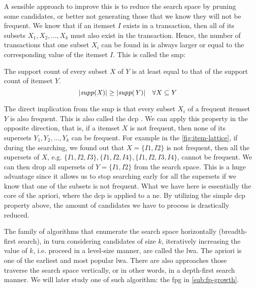A sensible approach to improve this is to reduce the search space by pruning some candidates, or better not generating those that we know they will not be frequent.
We know that if an itemset $I$ exists in a transaction, then all of its subsets $X_1, X_2, \dots, X_k$ must also exist in the transaction.
Hence, the number of transactions that one subset $X_i$ can be found in is always larger or equal to the corresponding value of the itemset $I$.
This is called the \acl{smp}:
\begin{definition}
    The support count of every subset $X$ of $Y$ is at least equal to that of the support count of itemset $Y$.
    \begin{equation}
        \lvert \mathit{supp({X})} \rvert \geq \lvert \mathit{supp({Y})} \rvert \quad \forall X \subseteq Y
    \end{equation}
\end{definition}

The direct implication from the \acl{smp} is that every subset $X_i$ of a frequent itemset $Y$ is also frequent.
This is also called the \acl{dcp} \citep{Aggarwal15}.
We can apply this property in the opposite direction, that is, if a itemset $X$ is not frequent, then none of its supersets $Y_1, Y_2, \dots, Y_k$ can be frequent.
For example in the \autoref{fig:item-lattice}, if during the searching, we found out that $X = \{I1, I2\}$ is not frequent, then all the supersets of $X$, e.g. $\{I1, I2, I3\}, \{I1, I2 , I4\}, \{I1, I2 , I3, I4\}$, cannot be frequent.
We can then drop all supersets of ${Y = \{I1, I2\}}$ from the search space.
This is a huge advantage since it allows us to stop searching early for all the supersets if we know that one of the subsets is not frequent.
What we have here is essentially the core of the \acl{apriori}, where the \acl{dcp} is applied to a \ac{ne}.
By utilizing the simple \acl{dcp} property above, the amount of candidates we have to process is drastically reduced.


The family of algorithms that enumerate the search space horizontally (breadth-first search), in turn considering candidates of size $k$, iteratively increasing the value of $k$, i.e. proceed in a level-size manner, are called the \acl{lwa}.
The \acl{apriori} is one of the earliest and most popular \acl{lwa}.
There are also approaches those traverse the search space vertically, or in other words, in a depth-first search manner.
We will later study one of such algorithm: the \acl{fpg} in \autoref{sub:fp-growth}.

